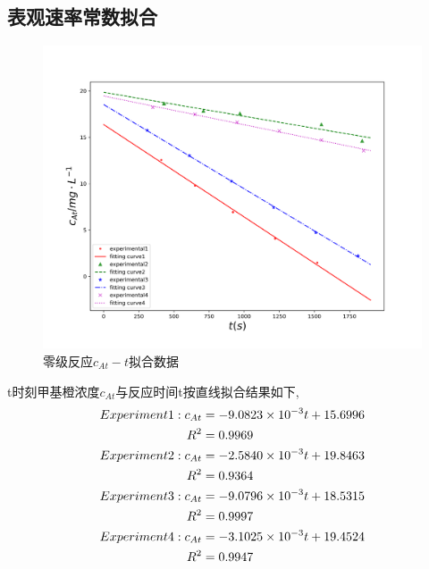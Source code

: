 \documentclass[a4paper]{article}
\begin{document}
\subsection{表观速率常数拟合}
\begin{figure}[H]
	\centering
	\includegraphics[width = 0.5\paperwidth]{fig/fitting1.png}
	\caption{零级反应$c_{At}-t$拟合数据}
\end{figure}
t时刻甲基橙浓度$c_{At}$与反应时间t按直线拟合结果如下,
\begin{equation}
	\centering
	\begin{aligned}
		Experiment1: c_{At} &= -9.0823\times 10^{-3}t + 15.6996\\
		R^{2} &= 0.9969\\
		Experiment2: c_{At} &= -2.5840\times 10^{-3}t + 19.8463\\
		R^{2} &= 0.9364\\
		Experiment3: c_{At} &= -9.0796\times 10^{-3}t + 18.5315\\
		R^{2} &= 0.9997\\
		Experiment4: c_{At} &= -3.1025\times 10^{-3}t + 19.4524\\
		R^{2} &= 0.9947\\
	\end{aligned}
\end{equation}
\end{document}

